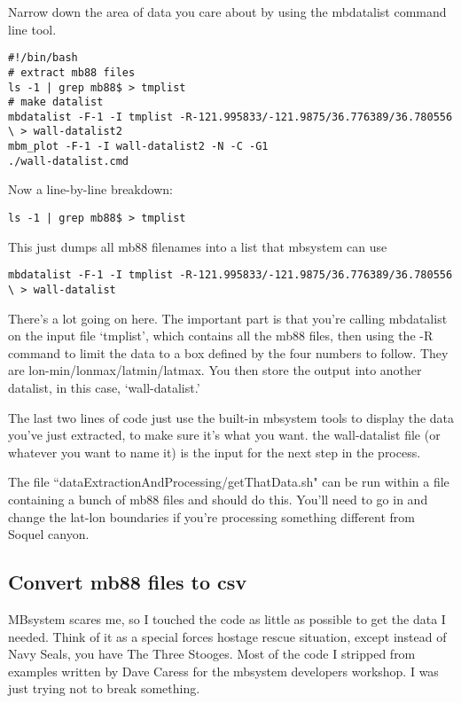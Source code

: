 \documentclass[12pt]{amsart}
\begin{document}
Narrow down the area of data you care about by using the mbdatalist command line tool. 
\vspace{12pt}
\begin{tiny}
\begin{lstlisting}
#!/bin/bash 
# extract mb88 files
ls -1 | grep mb88$ > tmplist
# make datalist
mbdatalist -F-1 -I tmplist -R-121.995833/-121.9875/36.776389/36.780556 \ > wall-datalist2
mbm_plot -F-1 -I wall-datalist2 -N -C -G1 
./wall-datalist.cmd 
\end{lstlisting}
\end{tiny}
\vspace{12pt}
Now a line-by-line breakdown:
\begin{lstlisting}
ls -1 | grep mb88$ > tmplist
\end{lstlisting}
This just dumps all mb88 filenames into a list that mbsystem can use
\vspace{12pt}
\begin{tiny}
\begin{lstlisting}
mbdatalist -F-1 -I tmplist -R-121.995833/-121.9875/36.776389/36.780556 \ > wall-datalist
\end{lstlisting}
\end{tiny}
\normalsize
There's a lot going on here. The important part is that you're calling mbdatalist on the input file `tmplist', which contains all the mb88 files, then using the -R command to limit the data to a box defined by the four numbers to follow. They are lon-min/lonmax/latmin/latmax. You then store the output into another datalist, in this case, `wall-datalist.'

The last two lines of code just use the built-in mbsystem tools to display the data you've just extracted, to make sure it's what you want. the wall-datalist file (or whatever you want to name it) is the input for the next step in the process.

The file ``dataExtractionAndProcessing/getThatData.sh" can be run within a file containing a bunch of mb88 files and should do this. You'll need to go in and change the lat-lon boundaries if you're processing something different from Soquel canyon.


\subsection{Convert mb88 files to csv}

MBsystem scares me, so I touched the code as little as possible to get the data I needed. Think of it as a special forces hostage rescue situation, except instead of Navy Seals, you have The Three Stooges. Most of the code I stripped from examples written by Dave Caress for the mbsystem developers workshop. I was just trying not to break something. 
\end{document}
